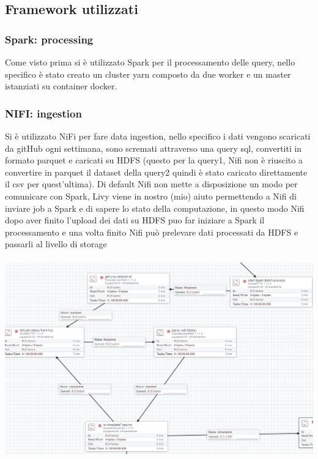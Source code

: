 \documentclass[acmsmall]{acmart}
\begin{document}
\subsection{Framework utilizzati}

\subsubsection{Spark: processing} 
Come visto prima si è utilizzato Spark per il processamento delle query, nello specifico è stato creato un cluster yarn composto da due worker e un master istanziati su container docker.

\subsubsection{NIFI: ingestion}
Si è utilizzato NiFi per fare data ingestion, nello specifico i dati vengono scaricati da gitHub ogni settimana, sono scremati attraverso una query sql, convertiti in formato parquet e caricati su HDFS (questo per la query1, Nifi non è riuscito a convertire in parquet il dataset della query2 quindi è stato caricato direttamente il csv per quest'ultima).
Di default Nifi non mette a disposizione un modo per comunicare con Spark, Livy viene in nostro (mio) aiuto permettendo a Nifi di inviare job a Spark e di sapere lo stato della computazione, in questo modo Nifi dopo aver finito l'upload dei dati su HDFS puo far iniziare a Spark il processamento e una volta finito Nifi può prelevare dati processati da HDFS e passarli al livello di storage \\ \\
\includegraphics[width=14cm]{livy.png}
\\ \\
\end{document}
